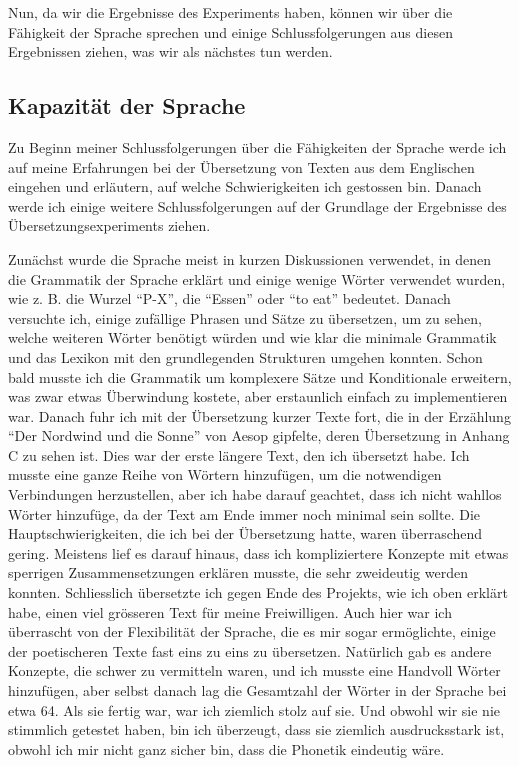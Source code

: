 \documentclass{article}
\begin{document}
Nun, da wir die Ergebnisse des Experiments haben, können wir über die Fähigkeit der Sprache sprechen
und einige Schlussfolgerungen aus diesen Ergebnissen ziehen, was wir als nächstes tun werden.

\subsection{Kapazität der Sprache}
Zu Beginn meiner Schlussfolgerungen über die Fähigkeiten der Sprache werde ich auf meine Erfahrungen
bei der Übersetzung von Texten aus dem Englischen eingehen und erläutern, auf welche Schwierigkeiten
ich gestossen bin. Danach werde ich einige weitere Schlussfolgerungen auf der Grundlage der Ergebnisse
des Übersetzungsexperiments ziehen.

Zunächst wurde die Sprache meist in kurzen Diskussionen verwendet,
in denen die Grammatik der Sprache erklärt und einige wenige Wörter verwendet wurden,
wie z. B. die Wurzel ``P-X'', die ``Essen'' oder ``to eat'' bedeutet. Danach versuchte ich,
einige zufällige Phrasen und Sätze zu übersetzen, um zu sehen, welche weiteren Wörter benötigt würden
und wie klar die minimale Grammatik und das Lexikon mit den grundlegenden Strukturen umgehen konnten.
Schon bald musste ich die Grammatik um komplexere Sätze und Konditionale erweitern,
was zwar etwas Überwindung kostete, aber erstaunlich einfach zu implementieren war.
Danach fuhr ich mit der Übersetzung kurzer Texte fort, die in der Erzählung ``Der Nordwind und die Sonne''
von Aesop gipfelte, deren Übersetzung in Anhang C zu sehen ist. Dies war der erste längere Text,
den ich übersetzt habe. Ich musste eine ganze Reihe von Wörtern hinzufügen,
um die notwendigen Verbindungen herzustellen, aber ich habe darauf geachtet,
dass ich nicht wahllos Wörter hinzufüge, da der Text am Ende immer noch minimal sein sollte.
Die Hauptschwierigkeiten, die ich bei der Übersetzung hatte, waren überraschend gering.
Meistens lief es darauf hinaus, dass ich kompliziertere Konzepte mit etwas sperrigen Zusammensetzungen
erklären musste, die sehr zweideutig werden konnten. Schliesslich übersetzte ich gegen Ende des Projekts,
wie ich oben erklärt habe, einen viel grösseren Text für meine Freiwilligen. Auch hier war ich überrascht
von der Flexibilität der Sprache, die es mir sogar ermöglichte, einige der poetischeren Texte fast eins
zu eins zu übersetzen. Natürlich gab es andere Konzepte, die schwer zu vermitteln waren, und ich musste
eine Handvoll Wörter hinzufügen, aber selbst danach lag die Gesamtzahl der Wörter in der Sprache bei etwa 64.
Als sie fertig war, war ich ziemlich stolz auf sie. Und obwohl wir sie nie stimmlich getestet haben,
bin ich überzeugt, dass sie ziemlich ausdrucksstark ist, obwohl ich mir nicht ganz sicher bin,
dass die Phonetik eindeutig wäre.
\end{document}
